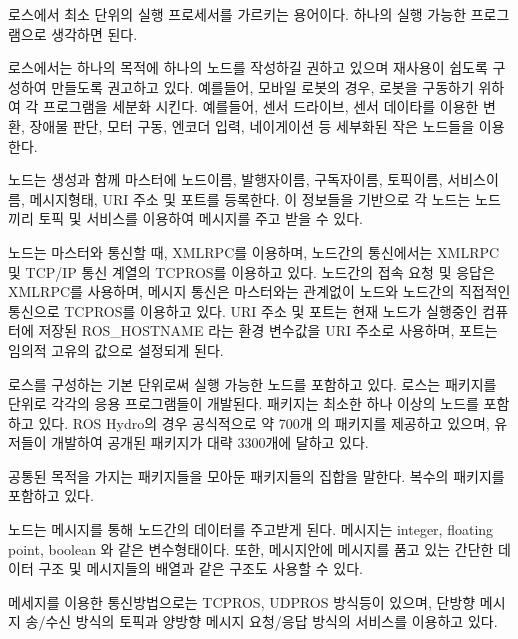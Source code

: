 \begin{definition}[노드(node)]\label{def:RosNode}
로스에서 최소 단위의 실행 프로세서를 가르키는 용어이다. 하나의 실행 가능한 프로그램으로 생각하면 된다. 

로스에서는 하나의 목적에 하나의 노드를 작성하길 권하고 있으며 재사용이 쉽도록 구성하여 만들도록 권고하고 있다. 예를들어, 모바일 로봇의 경우, 로봇을 구동하기 위하여 각 프로그램을 세분화 시킨다. 예를들어, 센서 드라이브, 센서 데이타를 이용한 변환, 장애물 판단, 모터 구동, 엔코더 입력, 네이게이션 등 세부화된 작은 노드들을 이용한다.

노드는 생성과 함께 마스터에 노드이름, 발행자이름, 구독자이름, 토픽이름, 서비스이름, 메시지형태, URI 주소 및 포트를 등록한다. 이 정보들을 기반으로 각 노드는 노드끼리 토픽 및 서비스를 이용하여 메시지를 주고 받을 수 있다.

노드는 마스터와 통신할 때, XMLRPC를 이용하며, 노드간의 통신에서는 XMLRPC 및 TCP/IP 통신 계열의 TCPROS를 이용하고 있다. 노드간의 접속 요청 및 응답은  XMLRPC를 사용하며, 메시지 통신은 마스터와는 관계없이 노드와 노드간의 직접적인 통신으로 TCPROS를 이용하고 있다. URI 주소 및 포트는 현재 노드가 실행중인 컴퓨터에 저장된 ROS\_HOSTNAME 라는 환경 변수값을 URI 주소로 사용하며, 포트는 임의적 고유의 값으로 설정되게 된다.  
\end{definition}

\begin{definition}\label{def:RosPackage}
로스를 구성하는 기본 단위로써 실행 가능한 노드를 포함하고 있다. 로스는 패키지를 단위로 각각의 응용 프로그램들이 개발된다. 패키지는 최소한 하나 이상의 노드를 포함하고 있다. ROS Hydro의 경우 공식적으로 약 700개 의 패키지를 제공하고 있으며, 유저들이 개발하여 공개된 패키지가 대략 3300개에 달하고 있다. 
\end{definition}

\begin{definition}\label{def:RosMetapackage}
공통된 목적을 가지는 패키지들을 모아둔 패키지들의 집합을 말한다. 복수의 패키지를 포함하고 있다.
\end{definition}

\begin{definition}\label{def:RosMessage}
노드는 메시지를 통해 노드간의 데이터를 주고받게 된다. 메시지는 integer, floating point, boolean 와 같은 변수형태이다. 또한, 메시지안에 메시지를 품고 있는 간단한 데이터 구조 및 메시지들의 배열과 같은 구조도 사용할 수 있다. 

메세지를 이용한 통신방법으로는 TCPROS, UDPROS 방식등이 있으며, 단방향 메시지 송/수신 방식의 토픽과 양방향 메시지 요청/응답 방식의 서비스를 이용하고 있다.
\end{definition}

